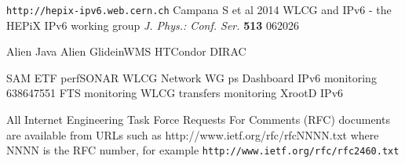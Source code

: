 \begin{thebibliography}{}
%
%


 {\tt http://hepix-ipv6.web.cern.ch}
 Campana S et al 2014 WLCG and IPv6 - the HEPiX IPv6 working group {\it J. Phys.: Conf. Ser.} {\bf513} 062026



  Alien
 Java Alien
 GlideinWMS
 HTCondor
 DIRAC

  SAM
  ETF
 perfSONAR
  WLCG Network WG
  ps Dashboard
  IPv6 monitoring
  638647551
  FTS monitoring
  WLCG transfers monitoring
  XrootD IPv6

 All Internet Engineering Task Force Requests For Comments (RFC) documents are available
from URLs such as http://www.ietf.org/rfc/rfcNNNN.txt where NNNN is the RFC number, for example {\tt http://www.ietf.org/rfc/rfc2460.txt}


\end{thebibliography}